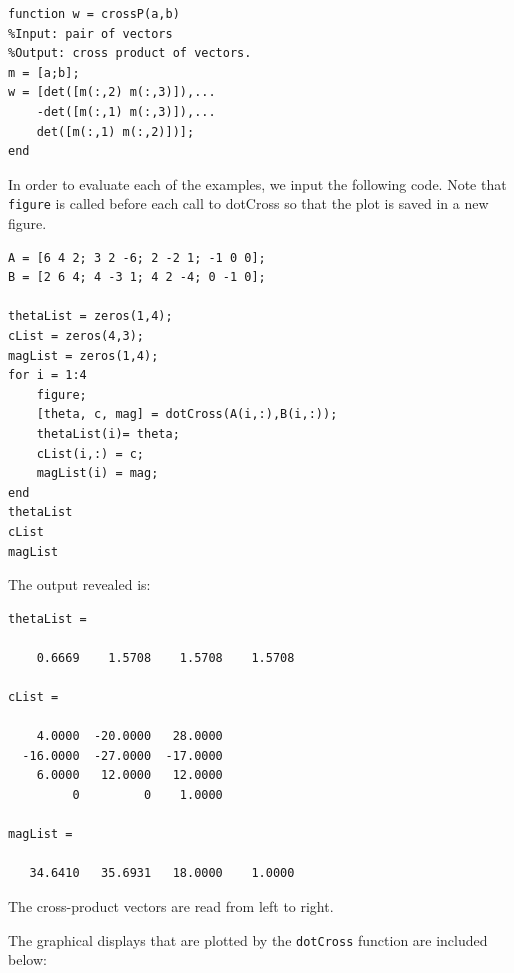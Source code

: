 \documentclass[12pt]{amsart}
\begin{document}
\begin{enumerate}
\begin{verbatim}
function w = crossP(a,b)
%Input: pair of vectors
%Output: cross product of vectors.
m = [a;b];
w = [det([m(:,2) m(:,3)]),...
    -det([m(:,1) m(:,3)]),...
    det([m(:,1) m(:,2)])];
end
\end{verbatim}

In order to evaluate each of the examples, we input the following
code. Note that {\tt figure} is called before each call to dotCross
so that the plot is saved in a new figure.

\begin{verbatim}
A = [6 4 2; 3 2 -6; 2 -2 1; -1 0 0];
B = [2 6 4; 4 -3 1; 4 2 -4; 0 -1 0];

thetaList = zeros(1,4);
cList = zeros(4,3);
magList = zeros(1,4);
for i = 1:4
    figure;
    [theta, c, mag] = dotCross(A(i,:),B(i,:));
    thetaList(i)= theta;
    cList(i,:) = c;
    magList(i) = mag;
end
thetaList
cList
magList
\end{verbatim}

The output revealed is:

\begin{verbatim}
thetaList =

    0.6669    1.5708    1.5708    1.5708

cList =

    4.0000  -20.0000   28.0000
  -16.0000  -27.0000  -17.0000
    6.0000   12.0000   12.0000
         0         0    1.0000

magList =

   34.6410   35.6931   18.0000    1.0000
\end{verbatim}
The cross-product vectors are read from left to
right.

\vfill
\pagebreak

The graphical displays that are plotted by the {\tt dotCross}
function are included below:



\end{enumerate}
\end{document}
